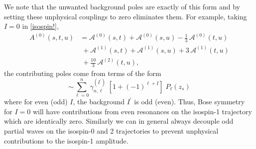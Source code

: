 \documentclass[aps,prd,amsmath,amssymb,superscriptaddress,onecolumn,
nofootinbib,showpacs,preprintnumbers]{revtex4-1}
\newcommand{\ma}{\mathcal{A}}
\newcommand{\maI}[1]{\mathcal{A}^{(#1)}}
\begin{document}
We note that the unwanted background poles are exactly of this form and by setting these unphysical couplings to zero eliminates them. For example, taking $I = 0$ in \cref{isospin!}, 
    \begin{align} \label{Azero}
    A^{(0)}(s,t,u) &= \maI{0}(s,t) + \maI{0}(s,u) - \frac{1}{3} \, \maI{0}(t,u) \nonumber \\[0.5em]
                        &\; + \maI{1}(s,t) + \maI{1}(s,u) + 3 \, \maI{1}(t,u)  \\[0.5em] 
                        &\; + \frac{10}{3} \, \maI{2}(t,u) \nonumber,
    \end{align}
the contributing poles come from terms of the form 
	\begin{equation}
			[ \ma^{(I^\prime)}(s,t) + (-1)^I \ma^{(I^\prime)}(s,u) ] \sim \sum_{\ell=0}^n \gamma_{n,\ell}^{(I^\prime)} \; [1 + (-1)^{\ell+I}] \; P_\ell(z_s)
	\end{equation}
where for even (odd) $I$, the background $I^\prime$ is odd (even). Thus, Bose symmetry for $I=0$ will have contributions from even resonances on the isospin-1 trajectory which are identically zero. Similarly we can in general always decouple odd partial waves on the isospin-0 and 2 trajectories to prevent unphysical contributions to the isospin-1 amplitude.

 	
 	
 	
 	
 	
 	
 	
 	
 	
 	
 	
 	
 	
 	
 	
 	
 	
 	
 	
 	
 	
 	
 	
 	
 	
 	
 	
 	
 	
 	
 	
 	
 	
 	
 	
 	
 	
 	
\end{document}
